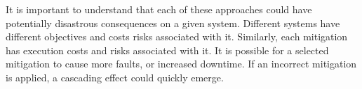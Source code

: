It is important to understand that each of these approaches could have potentially disastrous consequences on a given system. Different systems have different objectives and costs risks associated with it. Similarly, each mitigation has execution costs and risks associated with it. It is possible for a selected mitigation to cause more faults, or increased downtime. If an incorrect mitigation is applied, a cascading effect could quickly emerge.

